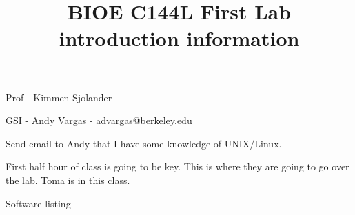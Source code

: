 \documentclass[11pt]{article}
\title{BIOE C144L First Lab introduction information}
\begin{document}
\maketitle

Prof - Kimmen Sjolander

GSI - Andy Vargas - advargas@berkeley.edu

Send email to Andy that I have some knowledge of UNIX/Linux.

First half hour of class is going to be key. This is where they are going to go
over the lab. Toma is in this class. 

Software listing
\end{document}
